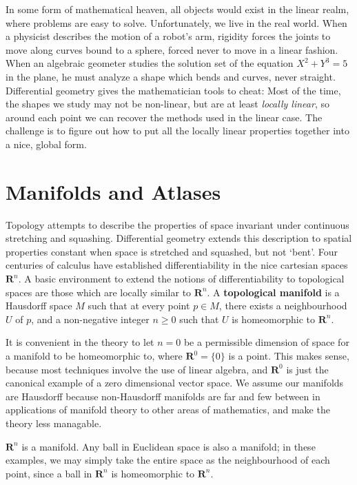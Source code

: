 In some form of mathematical heaven, all objects would exist in the linear realm, where problems are easy to solve. Unfortunately, we live in the real world.  When a physicist describes the motion of a robot's arm, rigidity forces the joints to move along curves bound to a sphere, forced never to move in a linear fashion. When an algebraic geometer studies the solution set of the equation $X^2 + Y^3 = 5$ in the plane, he must analyze a shape which bends and curves, never straight. Differential geometry gives the mathematician tools to cheat: Most of the time, the shapes we study may not be non-linear, but are at least {\it locally linear}, so around each point we can recover the methods used in the linear case. The challenge is to figure out how to put all the locally linear properties together into a nice, global form.

\section{Manifolds and Atlases}

Topology attempts to describe the properties of space invariant under continuous stretching and squashing. Differential geometry extends this description to spatial properties constant when space is stretched and squashed, but not `bent'. Four centuries of calculus have established differentiability in the nice cartesian spaces $\mathbf{R}^n$. A basic environment to extend the notions of differentiability to topological spaces are those which are locally similar to $\mathbf{R}^n$. A {\bf topological manifold} is a Hausdorff space $M$ such that at every point $p \in M$, there exists a neighbourhood $U$ of $p$, and a non-negative integer $n \geq 0$ such that $U$ is homeomorphic to $\mathbf{R}^n$.

\begin{remark}
    It is convenient in the theory to let $n = 0$ be a permissible dimension of space for a manifold to be homeomorphic to, where $\mathbf{R}^0 = \{ 0 \}$ is a point. This makes sense, because most techniques involve the use of linear algebra, and $\mathbf{R}^0$ is just the canonical example of a zero dimensional vector space. We assume our manifolds are Hausdorff because non-Hausdorff manifolds are far and few between in applications of manifold theory to other areas of mathematics, and make the theory less managable.
\end{remark}

\begin{example}
    $\mathbf{R}^n$ is a manifold. Any ball in Euclidean space is also a manifold; in these examples, we may simply take the entire space as the neighbourhood of each point, since a ball in $\mathbf{R}^n$ is homeomorphic to $\mathbf{R}^n$.
\end{example}

